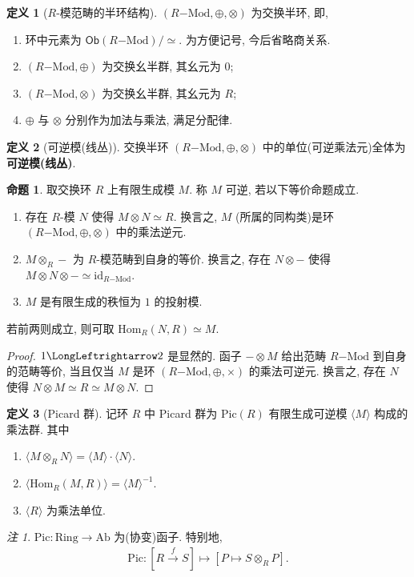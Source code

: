 \documentclass{MainStyle}
\theoremstyle{definition}
\theoremstyle{definition}
\theoremstyle{definition}
\newtheorem{definition}{定义}
\theoremstyle{definition}
\newtheorem{proposition}{命题}
\theoremstyle{definition}
\theoremstyle{definition}
\theoremstyle{definition}
\theoremstyle{remark}
\newtheorem{remark}{注}
\theoremstyle{remark}
\begin{document}
\begin{definition}[$R$-模范畴的半环结构]
    $(R\mathrm{-Mod},\oplus, \otimes)$ 为交换半环, 即,
    \begin{enumerate}
        \item 环中元素为 $\mathsf{Ob}(R\mathrm{-Mod})/\simeq$. 为方便记号, 今后省略商关系.
        \item $(R\mathrm{-Mod},\oplus)$ 为交换幺半群, 其幺元为 $0$;
        \item $(R\mathrm{-Mod}, \otimes)$ 为交换幺半群, 其幺元为 $R$;
        \item $\oplus$ 与 $\otimes$ 分别作为加法与乘法, 满足分配律.
    \end{enumerate}
\end{definition}

\begin{definition}[可逆模(线丛)]
    交换半环 $(R\mathrm{-Mod},\oplus, \otimes)$ 中的单位(可逆乘法元)全体为\textbf{可逆模(线丛)}.
\end{definition}

\begin{proposition}
    取交换环 $R$ 上有限生成模 $M$. 称 $M$ 可逆, 若以下等价命题成立.
    \begin{enumerate}
        \item 存在 $R$-模 $N$ 使得 $M\otimes N\simeq R$. 换言之, $M$ (所属的同构类)是环 $(R\mathrm{-Mod},\oplus,\otimes)$ 中的乘法逆元.
        \item $M\otimes_R-$ 为 $R$-模范畴到自身的等价. 换言之, 存在 $N\otimes-$ 使得 $M\otimes N\otimes -\simeq \mathrm{id}_{R\mathrm{-Mod}}$.
        \item $M$ 是有限生成的秩恒为 $1$ 的投射模.
    \end{enumerate}
    若前两则成立, 则可取 $\mathrm{Hom}_R(N,R)\simeq M$.
    \begin{proof}
        $1\LongLeftrightarrow 2$ 是显然的. 函子 $-\otimes M$ 给出范畴 $R\mathrm{-Mod}$ 到自身的范畴等价, 当且仅当 $M$ 是环 $(R\mathrm{-Mod},\oplus,\times)$ 的乘法可逆元. 换言之, 存在 $N$ 使得 $N\otimes M\simeq R\simeq M\otimes N$.\par

    \end{proof}
\end{proposition}



\begin{definition}[Picard 群]
    记环 $R$ 中 Picard 群为 $\mathrm{Pic}(R)$ 有限生成可逆模 $\langle M\rangle$ 构成的乘法群. 其中
    \begin{enumerate}
        \item $\langle M\otimes_R N\rangle=\langle M\rangle\cdot \langle  N\rangle$.
        \item $\langle \mathrm{Hom}_R(M,R)\rangle=\langle M\rangle^{-1}$.
        \item $\langle R\rangle$ 为乘法单位.
    \end{enumerate}
\end{definition}

\begin{remark}
    $\mathrm{Pic}:\mathrm{Ring}\to \mathrm{Ab}$ 为(协变)函子. 特别地,
    \begin{align*}
        \mathrm{Pic}:\left[R\overset f\longrightarrow S\right]\mapsto [P\mapsto S\otimes_R P].
    \end{align*}
\end{remark}
\end{document}
